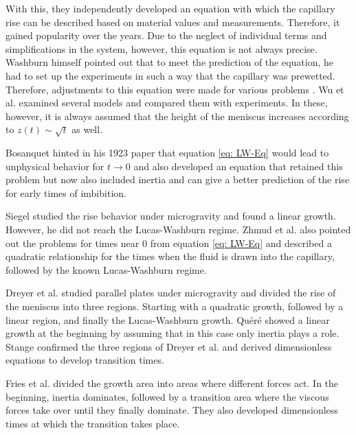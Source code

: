With this, they independently developed an equation with which the capillary rise can be described based on material values and measurements. Therefore, it gained popularity over the years. Due to the neglect of individual terms and simplifications in the system, however, this equation is not always precise. Washburn himself pointed out that to meet the prediction of the equation, he had to set up the experiments in such a way that the capillary was prewetted. Therefore, adjustments to this equation were made for various problems \cite{dimitrov2007CapillaryRiseNanopores}. Wu et al. \cite{wu2017CapillaryRiseValidity} examined several models and compared them with experiments. In these, however, it is always assumed that the height of the meniscus increases according to $z(t)\sim \sqrt{t}$ as well.

Bosanquet \cite{bosanquet1923LVFlowLiquids} hinted in his 1923 paper that equation \ref{eq: LW-Eq} would lead to unphysical behavior for $t\xrightarrow{}0$ and also developed an equation that retained this problem but now also included inertia and can give a better prediction of the rise for early times of imbibition. 

Siegel \cite{siegel1961TransientCapillaryRise} studied the rise behavior under microgravity and found a linear growth. However, he did not reach the Lucas-Washburn regime. Zhmud et al. \cite{zhmud2000DynamicsCapillaryRise} also pointed out the problems for times near $0$ from equation \ref{eq: LW-Eq} and described a quadratic relationship for the times when the fluid is drawn into the capillary, followed by the known Lucas-Washburn regime.

Dreyer et al. \cite{dreyer1994CapillaryRiseLiquid} studied parallel plates under microgravity and divided the rise of the meniscus into three regions. Starting with a quadratic growth, followed by a linear region, and finally the Lucas-Washburn growth. Quéré \cite{quere1997InertialCapillarity} showed a linear growth at the beginning by assuming that in this case only inertia plays a role. Stange \cite{stange2003CapillaryDrivenFlow} confirmed the three regions of Dreyer et al. \cite{dreyer1994CapillaryRiseLiquid} and derived dimensionless equations to develop transition times.

Fries et al. \cite{fries2008TransitionInertialViscous} divided the growth area into areas where different forces act. In the beginning, inertia dominates, followed by a transition area where the viscous forces take over until they finally dominate. They also developed dimensionless times at which the transition takes place.


